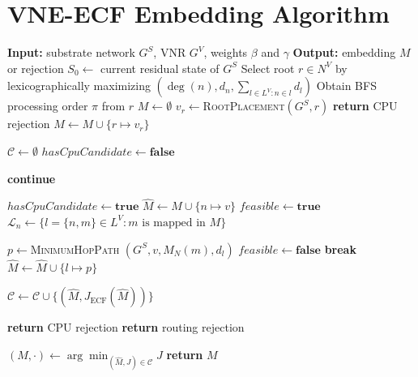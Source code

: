 \documentclass{ieeeaccess}
\newcommand{\ecfvne}{VNE-ECF}
\begin{document}
\section{\ecfvne{} Embedding Algorithm}
\label{sec:embedding_algorithm}

\begin{algorithm}[!t]
	\caption{\ecfvne{} Main Greedy Embedding Algorithm}
	\label{alg:ecf_main}
	\footnotesize
	\begin{algorithmic}[1]
		\STATE \textbf{Input:} substrate network $G^S$, VNR $G^V$, weights
		$\beta$ and $\gamma$
		\STATE \textbf{Output:} embedding $M$ or rejection
		\STATE $S_0\leftarrow$ current residual state of $G^S$
		\STATE Select root $r\in N^V$ by lexicographically maximizing
		$\left(\deg(n),d_n,\sum_{l\in L^V:n\in l}d_l\right)$
		\STATE Obtain BFS processing order $\pi$ from $r$
		\STATE $M\leftarrow\emptyset$
		\STATE $v_r\leftarrow$\textsc{RootPlacement}$(G^S,r)$
		\STATE \textbf{return} CPU rejection
		\ENDIF
		\STATE $M\leftarrow M\cup\{r\mapsto v_r\}$
		
		\STATE $\mathcal{C}\leftarrow\emptyset$
		\STATE $\mathit{hasCpuCandidate}\leftarrow\textbf{false}$
		
		\STATE \textbf{continue}
		\ENDIF
		
		\STATE $\mathit{hasCpuCandidate}\leftarrow\textbf{true}$
		\STATE $\widehat{M}\leftarrow M\cup\{n\mapsto v\}$
		\STATE $\mathit{feasible}\leftarrow\textbf{true}$
		\STATE $\mathcal{L}_n\leftarrow
		\{l=\{n,m\}\in L^V:m\text{ is mapped in }M\}$
		
		\STATE $p\leftarrow$\textsc{MinimumHopPath}
		$(G^S,v,M_N(m),d_l)$
		\STATE $\mathit{feasible}\leftarrow\textbf{false}$
		\STATE \textbf{break}
		\ENDIF
		\STATE $\widehat{M}\leftarrow\widehat{M}\cup\{l\mapsto p\}$
		\ENDFOR
		
		\STATE $\mathcal{C}\leftarrow\mathcal{C}\cup
		\{(\widehat{M},J_{\mathrm{ECF}}(\widehat{M}))\}$
		\ENDIF
		\ENDFOR
		
		\STATE \textbf{return} CPU rejection
		\ELSE
		\STATE \textbf{return} routing rejection
		\ENDIF
		\ENDIF
		
		\STATE $(M,\cdot)\leftarrow
		\arg\min_{(\widehat{M},J)\in\mathcal{C}} J$
		\ENDFOR
		\STATE \textbf{return} $M$
	\end{algorithmic}
\end{algorithm}
\end{document}
